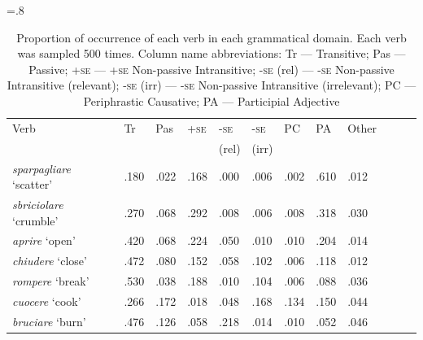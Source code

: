 \documentclass[output=paper,colorlinks,citecolor=brown
]{langscibook}
\begin{document}
\begin{table}[H]
\caption{Proportion of occurrence of each verb in each grammatical domain. Each verb was sampled 500 times. Column name abbreviations: Tr — Transitive; Pas — Passive; +\textsc{se} — +\textsc{se} Non-passive Intransitive; -\textsc{se} (rel) — -\textsc{se} Non-passive Intransitive (relevant); -\textsc{se} (irr) — -\textsc{se} Non-passive Intransitive (irrelevant); PC — Periphrastic Causative; PA — Participial Adjective}
\label{tab:table5}
\tabcolsep=.8\tabcolsep
\begin{tabular}{llllllllllll}
\lsptoprule
Verb & Tr & Pas & +\textsc{se} & -\textsc{se} & -\textsc{se} & PC & PA & Other\\
     &    &     &              & (rel)        & (irr) & & & \\
\midrule
\textit{sparpagliare} `scatter' & .180     & .022   & .168                       & .000                                   & .006                                     & .002                  & .610                & .012  \\
\textit{sbriciolare} `crumble'  & .270     & .068   & .292                       & .008                                   & .006                                     & .008                  & .318                & .030   \\
\textit{aprire} `open'          & .420     & .068   & .224                       & .050                                   & .010                                     & .010                  & .204                & .014  \\
\textit{chiudere} `close'       & .472     & .080   & .152                       & .058                                   & .102                                    & .006                  & .118                & .012   \\
\textit{rompere} `break'        & .530     & .038   & .188                       & .010                                   & .104                                    & .006                  & .088                 & .036  \\
\textit{cuocere} `cook'         & .266     & .172  & .018                        & .048                                   & .168                                    & .134                 & .150                & .044  \\
\textit{bruciare} `burn'        & .476     & .126  & .058                        & .218                                  & .014                                     & .010                  & .052                 & .046  \\

\end{tabular}
\end{table}
\end{document}
